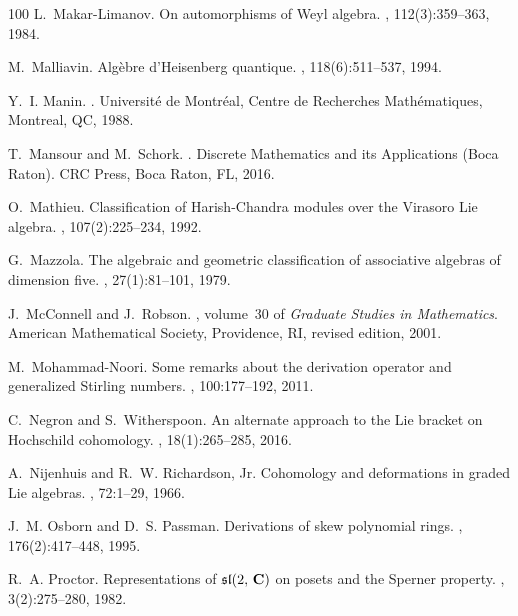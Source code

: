 \documentclass{commat}
\begin{document}
\begin{thebibliography}{100}
L.~Makar-Limanov.
\newblock On automorphisms of {W}eyl algebra.
, 112(3):359--363, 1984.

M.~Malliavin.
\newblock Alg\`ebre d'{H}eisenberg quantique.
, 118(6):511--537, 1994.

Y.~I. Manin.
.
\newblock Universit\'e de Montr\'eal, Centre de Recherches Math\'ematiques,
  Montreal, QC, 1988.

T.~Mansour and M.~Schork.
.
\newblock Discrete Mathematics and its Applications (Boca Raton). CRC Press,
  Boca Raton, FL, 2016.

O.~Mathieu.
\newblock Classification of {H}arish-{C}handra modules over the {V}irasoro
  {L}ie algebra.
, 107(2):225--234, 1992.

G.~Mazzola.
\newblock The algebraic and geometric classification of associative algebras of
  dimension five.
, 27(1):81--101, 1979.

J.~McConnell and J.~Robson.
, volume~30 of {\em Graduate
  Studies in Mathematics}.
\newblock American Mathematical Society, Providence, RI, revised edition, 2001.

M.~Mohammad-Noori.
\newblock Some remarks about the derivation operator and generalized {S}tirling
  numbers.
, 100:177--192, 2011.

C.~Negron and S.~Witherspoon.
\newblock An alternate approach to the {L}ie bracket on {H}ochschild
  cohomology.
, 18(1):265--285, 2016.

A.~Nijenhuis and R.~W. Richardson, Jr.
\newblock Cohomology and deformations in graded {L}ie algebras.
, 72:1--29, 1966.

J.~M. Osborn and D.~S. Passman.
\newblock Derivations of skew polynomial rings.
, 176(2):417--448, 1995.

R.~A. Proctor.
\newblock Representations of {${\mathfrak s}{\mathfrak l}(2,\,{\bf C})$} on
  posets and the {S}perner property.
, 3(2):275--280, 1982.


\end{thebibliography}
\end{document}
